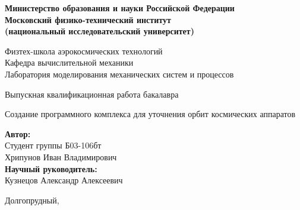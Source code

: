 \begin{center}
    \large\textbf{Министерство образования и науки Российской Федерации \\
    Московский физико-технический институт \\
    (национальный исследовательский университет)} \\
    \vspace{1cm}

    Физтех-школа аэрокосмических технологий \\

    Кафедра вычислительной механики \\
    Лаборатория моделирования механических систем и процессов\\

    \vspace{3em}

    Выпускная квалификационная работа бакалавра
\end{center}

\begin{center}
    \vspace{\fill}
    \LARGE{Создание программного комплекса для уточнения орбит космических аппаратов}

    \vspace{\fill}
\end{center}


\begin{flushright}
    \textbf{Автор:} \\
    Студент группы Б03-106бт \\
    Хрипунов Иван Владимирович \\
    \vspace{2em}
    \textbf{Научный руководитель:} \\
    Кузнецов Александр Алексеевич \\
    \vspace{2em}
\end{flushright}

\vspace{7em}

\begin{center}
    Долгопрудный, \the\year{}
\end{center}

\thispagestyle{empty}

\newpage
\setcounter{page}{2}
